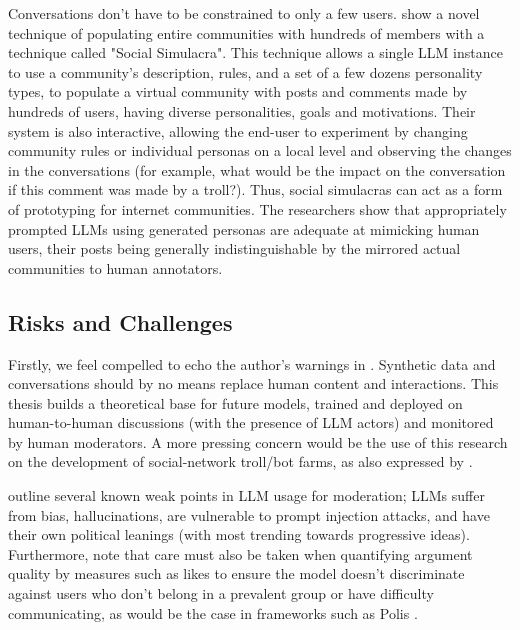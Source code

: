 Conversations don't have to be constrained to only a few users. \cite{park2022socialsimulacracreatingpopulated} show a novel technique of populating entire communities with hundreds of members with a technique called "Social Simulacra". This technique allows a single LLM instance to use a community's description, rules, and a set of a few dozens personality types, to populate a virtual community with posts and comments made by hundreds of users, having diverse personalities, goals and motivations. Their system is also interactive, allowing the end-user to experiment by changing community rules or individual personas on a local level and observing the changes in the conversations (for example, what would be the impact on the conversation if this comment was made by a troll?). Thus, social simulacras can act as a form of prototyping for internet communities. The researchers show that appropriately prompted LLMs using generated personas are adequate at mimicking human users, their posts being generally indistinguishable by the mirrored actual communities to human annotators.  


\subsection{Risks and Challenges}
\label{sec:related:challenges}

Firstly, we feel compelled to echo the author's warnings in \cite{small-polis-llm}. Synthetic data and conversations should by no means replace human content and interactions. This thesis builds a theoretical base for future models, trained and deployed on human-to-human discussions (with the presence of LLM actors) and monitored by human moderators. A more pressing concern would be the use of this research on the development of social-network troll/bot farms, as also expressed by \cite{park2022socialsimulacracreatingpopulated}.

\cite{small-polis-llm} outline several known weak points in LLM usage for moderation; LLMs suffer from bias, hallucinations, are vulnerable to prompt injection attacks, and have their own political leanings (with most trending towards progressive ideas). Furthermore, \cite{vecchi-2021-towards} note that care must also be taken when quantifying argument quality by measures such as likes to ensure the model doesn't discriminate against users who don't belong in a prevalent group or have difficulty communicating, as would be the case in frameworks such as Polis \cite{small2021polis}.

